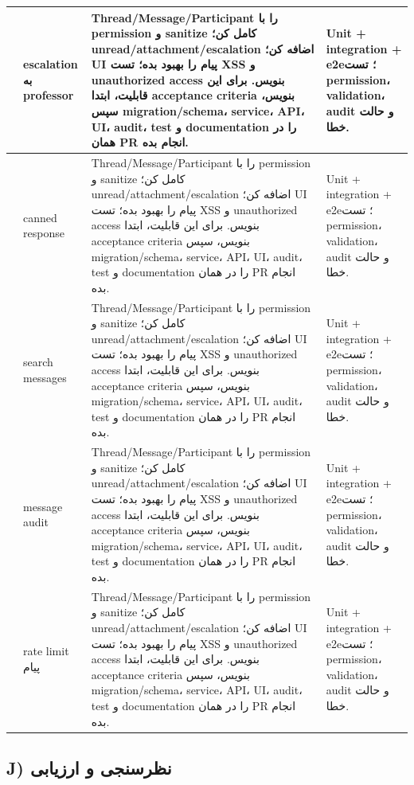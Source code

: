 \documentclass[11pt,a4paper]{article}
\begin{document}
\begin{longtable}{|>{\raggedleft\arraybackslash}p{}|>{\raggedleft\arraybackslash}p{}|>{\raggedleft\arraybackslash}p{}|>{\raggedleft\arraybackslash}p{}|}
156 & escalation به professor & Thread/Message/Participant را با permission و sanitize کامل کن؛ unread/attachment/escalation اضافه کن؛ UI پیام را بهبود بده؛ تست XSS و unauthorized access بنویس. برای این قابلیت، ابتدا acceptance criteria بنویس، سپس migration/schema، service، API، UI، audit، test و documentation را در همان PR انجام بده. & Unit + integration + e2e؛ تست permission، validation، audit و حالت خطا. \\ \hline
157 & canned response & Thread/Message/Participant را با permission و sanitize کامل کن؛ unread/attachment/escalation اضافه کن؛ UI پیام را بهبود بده؛ تست XSS و unauthorized access بنویس. برای این قابلیت، ابتدا acceptance criteria بنویس، سپس migration/schema، service، API، UI، audit، test و documentation را در همان PR انجام بده. & Unit + integration + e2e؛ تست permission، validation، audit و حالت خطا. \\ \hline
158 & search messages & Thread/Message/Participant را با permission و sanitize کامل کن؛ unread/attachment/escalation اضافه کن؛ UI پیام را بهبود بده؛ تست XSS و unauthorized access بنویس. برای این قابلیت، ابتدا acceptance criteria بنویس، سپس migration/schema، service، API، UI، audit، test و documentation را در همان PR انجام بده. & Unit + integration + e2e؛ تست permission، validation، audit و حالت خطا. \\ \hline
159 & message audit & Thread/Message/Participant را با permission و sanitize کامل کن؛ unread/attachment/escalation اضافه کن؛ UI پیام را بهبود بده؛ تست XSS و unauthorized access بنویس. برای این قابلیت، ابتدا acceptance criteria بنویس، سپس migration/schema، service، API، UI، audit، test و documentation را در همان PR انجام بده. & Unit + integration + e2e؛ تست permission، validation، audit و حالت خطا. \\ \hline
160 & rate limit پیام & Thread/Message/Participant را با permission و sanitize کامل کن؛ unread/attachment/escalation اضافه کن؛ UI پیام را بهبود بده؛ تست XSS و unauthorized access بنویس. برای این قابلیت، ابتدا acceptance criteria بنویس، سپس migration/schema، service، API، UI، audit، test و documentation را در همان PR انجام بده. & Unit + integration + e2e؛ تست permission، validation، audit و حالت خطا. \\ \hline
\end{longtable}
\subsection{J) نظرسنجی و ارزیابی}
\end{document}
